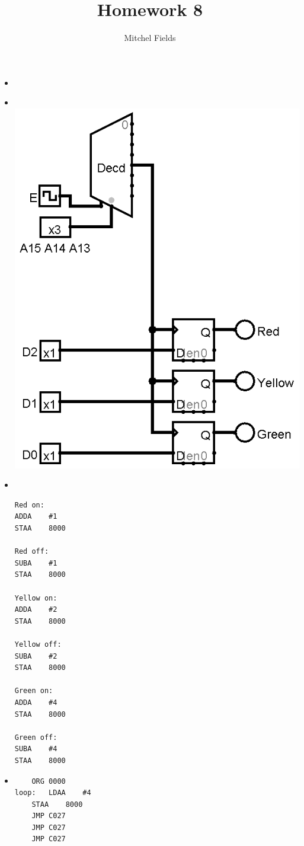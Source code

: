 \documentclass{article}
\title{Homework 8}
\author{Mitchel Fields}
\begin{document}
\maketitle

\begin{itemize}
	\item [\textbf{Problem 1}]
	\item [Question 1]\hspace{0pt}\\
	\includegraphics[scale=0.5]{hw8}
	\item [Question 2]\hspace{0pt}\\
\begin{verbatim}
Red on:
ADDA	#1
STAA	8000

Red off:
SUBA	#1
STAA	8000

Yellow on:
ADDA	#2
STAA	8000

Yellow off:
SUBA	#2
STAA	8000

Green on:
ADDA	#4
STAA	8000

Green off:
SUBA	#4
STAA	8000
\end{verbatim}
	\item [Question 3]
\begin{verbatim}
	ORG	0000
loop:	LDAA	#4
	STAA	8000
	JMP	C027
	JMP	C027
	JMP	C027


\end{verbatim}
\end{itemize}
\end{document}
